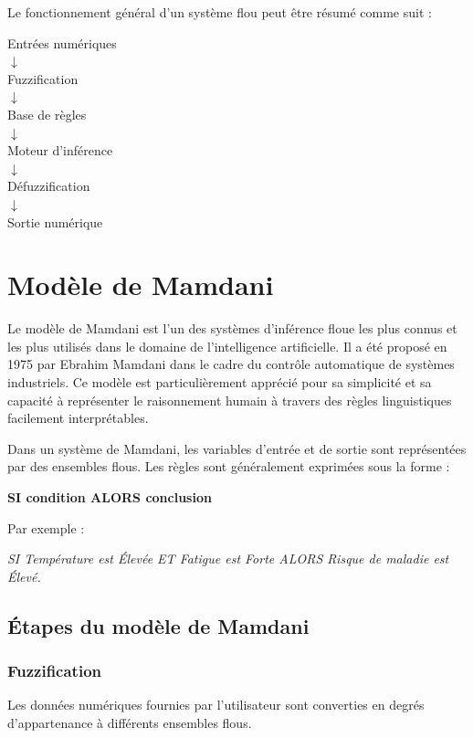 \documentclass[a4paper,12pt]{report} %
\begin{document}
Le fonctionnement général d'un système flou peut être résumé comme suit :

\begin{center}
Entrées numériques \\
$\downarrow$ \\
Fuzzification \\
$\downarrow$ \\
Base de règles \\
$\downarrow$ \\
Moteur d'inférence \\
$\downarrow$ \\
Défuzzification \\
$\downarrow$ \\
Sortie numérique
\end{center}

\section{Modèle de Mamdani}

Le modèle de Mamdani est l'un des systèmes d'inférence floue les plus connus et les plus utilisés dans le domaine de l'intelligence artificielle. Il a été proposé en 1975 par Ebrahim Mamdani dans le cadre du contrôle automatique de systèmes industriels. Ce modèle est particulièrement apprécié pour sa simplicité et sa capacité à représenter le raisonnement humain à travers des règles linguistiques facilement interprétables.

Dans un système de Mamdani, les variables d'entrée et de sortie sont représentées par des ensembles flous. Les règles sont généralement exprimées sous la forme :

\begin{center}
\textbf{SI condition ALORS conclusion}
\end{center}

Par exemple :

\begin{center}
\textit{SI Température est Élevée ET Fatigue est Forte ALORS Risque de maladie est Élevé.}
\end{center}

\subsection{Étapes du modèle de Mamdani}

\subsubsection{Fuzzification}
Les données numériques fournies par l'utilisateur sont converties en degrés d'appartenance à différents ensembles flous.
\end{document}
